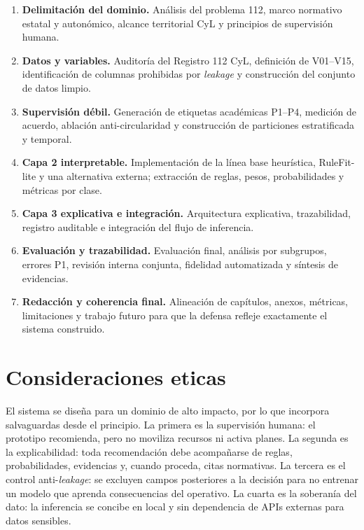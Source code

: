 \begin{enumerate}
    \item \textbf{Delimitación del dominio.} Análisis del problema 112, marco normativo estatal y autonómico, alcance territorial CyL y principios de supervisión humana.
    \item \textbf{Datos y variables.} Auditoría del Registro 112 CyL, definición de V01--V15, identificación de columnas prohibidas por \textit{leakage} y construcción del conjunto de datos limpio.
    \item \textbf{Supervisión débil.} Generación de etiquetas académicas P1--P4, medición de acuerdo, ablación anti-circularidad y construcción de particiones estratificada y temporal.
    \item \textbf{Capa 2 interpretable.} Implementación de la línea base heurística, RuleFit-lite y una alternativa externa; extracción de reglas, pesos, probabilidades y métricas por clase.
    \item \textbf{Capa 3 explicativa e integración.} Arquitectura explicativa, trazabilidad, registro auditable e integración del flujo de inferencia.
    \item \textbf{Evaluación y trazabilidad.} Evaluación final, análisis por subgrupos, errores P1, revisión interna conjunta, fidelidad automatizada y síntesis de evidencias.
    \item \textbf{Redacción y coherencia final.} Alineación de capítulos, anexos, métricas, limitaciones y trabajo futuro para que la defensa refleje exactamente el sistema construido.
\end{enumerate}

\section{Consideraciones eticas}

El sistema se diseña para un dominio de alto impacto, por lo que incorpora salvaguardas desde el principio. La primera es la supervisión humana: el prototipo recomienda, pero no moviliza recursos ni activa planes. La segunda es la explicabilidad: toda recomendación debe acompañarse de reglas, probabilidades, evidencias y, cuando proceda, citas normativas. La tercera es el control anti-\textit{leakage}: se excluyen campos posteriores a la decisión para no entrenar un modelo que aprenda consecuencias del operativo. La cuarta es la soberanía del dato: la inferencia se concibe en local y sin dependencia de APIs externas para datos sensibles.

